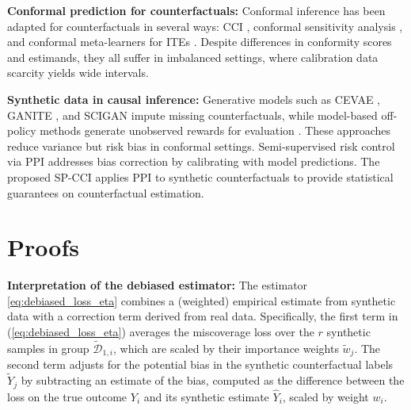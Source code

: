 \documentclass{article}
\theoremstyle{plain}
\theoremstyle{definition}
\theoremstyle{remark}
\begin{document}
\noindent \textbf{Conformal prediction for counterfactuals:} Conformal inference has been adapted for counterfactuals in several ways: CCI \citep{lei2021conformal}, conformal sensitivity analysis \citep{yin2024conformal}, and conformal meta-learners for ITEs \citep{alaa2023conformal}. Despite differences in conformity scores and estimands, they all suffer in imbalanced settings, where calibration data scarcity yields wide intervals.

\noindent \textbf{Synthetic data in causal inference:} Generative models such as CEVAE \citep{louizos2017causal}, GANITE \citep{yoon2018ganite}, and SCIGAN \citep{bica2020estimating} impute missing counterfactuals, while model-based off-policy methods generate unobserved rewards for evaluation \citep{swaminathan2015counterfactual, thomas2016data}. These approaches reduce variance but risk bias in conformal settings. Semi-supervised risk control via PPI \citep{einbinder2024semi} addresses bias correction by calibrating with model predictions. The proposed SP-CCI applies PPI to synthetic counterfactuals to provide statistical guarantees on counterfactual estimation.


\section{Proofs}
\label{appendix:proofs}

\textbf{Interpretation of the debiased estimator:} The estimator \eqref{eq:debiased_loss_eta} combines a (weighted) empirical estimate from synthetic data with a correction term derived from real data. Specifically, the first term in (\ref{eq:debiased_loss_eta}) averages the miscoverage loss over the $r$ synthetic samples in group $\tilde{\mathcal{D}}_{1, i}$, which are scaled by their importance weights $\tilde{w}_j$. The second term adjusts for the potential bias in the synthetic counterfactual labels $\tilde{Y}_j$ by subtracting an estimate of the bias, computed as the difference between the loss on the true outcome $Y_i$ and its synthetic estimate $\hat{Y}_i$, scaled by weight $w_i$.
\end{document}
